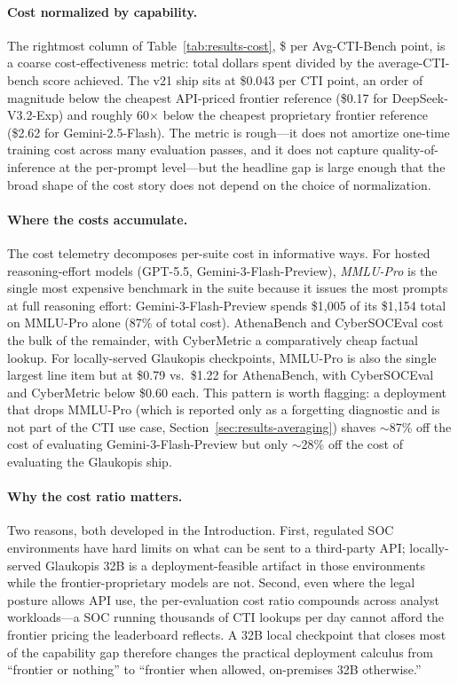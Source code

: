\documentclass[webpdf,contemporary,large]{oup-authoring-template}
\theoremstyle{thmstyleone}
\theoremstyle{thmstyletwo}
\theoremstyle{thmstylethree}
\begin{document}
\paragraph{Cost normalized by capability.}
The rightmost column of Table~\ref{tab:results-cost}, \$ per Avg-CTI-Bench point, is a coarse cost-effectiveness metric: total dollars spent divided by the average-CTI-bench score achieved. The v21 ship sits at \$0.043 per CTI point, an order of magnitude below the cheapest API-priced frontier reference (\$0.17 for DeepSeek-V3.2-Exp) and roughly 60$\times$ below the cheapest proprietary frontier reference (\$2.62 for Gemini-2.5-Flash). The metric is rough---it does not amortize one-time training cost across many evaluation passes, and it does not capture quality-of-inference at the per-prompt level---but the headline gap is large enough that the broad shape of the cost story does not depend on the choice of normalization.

\paragraph{Where the costs accumulate.}
The cost telemetry decomposes per-suite cost in informative ways. For hosted reasoning-effort models (GPT-5.5, Gemini-3-Flash-Preview), \emph{MMLU-Pro} is the single most expensive benchmark in the suite because it issues the most prompts at full reasoning effort: Gemini-3-Flash-Preview spends \$1{,}005 of its \$1{,}154 total on MMLU-Pro alone (87\% of total cost). AthenaBench and CyberSOCEval cost the bulk of the remainder, with CyberMetric a comparatively cheap factual lookup. For locally-served Glaukopis checkpoints, MMLU-Pro is also the single largest line item but at \$0.79 vs.\ \$1.22 for AthenaBench, with CyberSOCEval and CyberMetric below \$0.60 each. This pattern is worth flagging: a deployment that drops MMLU-Pro (which is reported only as a forgetting diagnostic and is not part of the CTI use case, Section~\ref{sec:results-averaging}) shaves $\sim$87\% off the cost of evaluating Gemini-3-Flash-Preview but only $\sim$28\% off the cost of evaluating the Glaukopis ship.

\paragraph{Why the cost ratio matters.}
Two reasons, both developed in the Introduction. First, regulated SOC environments have hard limits on what can be sent to a third-party API; locally-served Glaukopis 32B is a deployment-feasible artifact in those environments while the frontier-proprietary models are not. Second, even where the legal posture allows API use, the per-evaluation cost ratio compounds across analyst workloads---a SOC running thousands of CTI lookups per day cannot afford the frontier pricing the leaderboard reflects. A 32B local checkpoint that closes most of the capability gap therefore changes the practical deployment calculus from ``frontier or nothing'' to ``frontier when allowed, on-premises 32B otherwise.''
\end{document}
